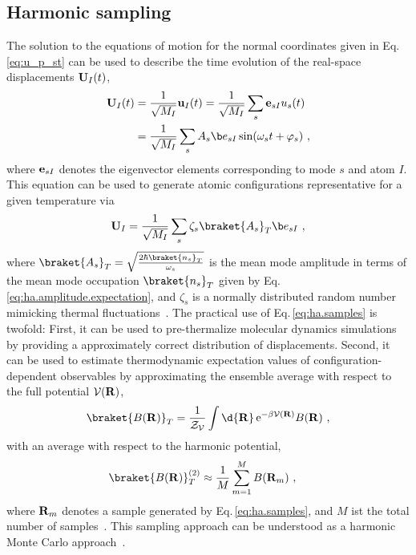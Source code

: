 \subsection{Harmonic sampling}
\label{sec:harmonic_sampling}
The solution to the equations of motion for the normal coordinates given in Eq.\,\eqref{eq:u_p_st} can be used to describe the time evolution of the real-space displacements ${\bf U}_I (t)$,
\begin{align}
	{\bf U}_I (t) 
		&= \frac{1}{\sqrt{M_I}} {\bf u}_I (t) 
		= \frac{1}{\sqrt{M_I}} \sum_s {\bf e}_{sI} u_s (t) \\
		&= \frac{1}{\sqrt{M_I}} \sum_s  A_s \b e_{sI} \sin (\omega_s t + \varphi_s)~,
\end{align}
where ${\bf e}_{sI}$ denotes the eigenvector elements corresponding to mode $s$ and atom $I$. This equation can be used to generate atomic configurations representative for a given temperature via
\begin{align}
	{\bf U}_I = \frac{1}{\sqrt{M_I}} \sum_s  \zeta_s \braket{A_s}_T \b e_{sI}~,
	\label{eq:ha.samples}
\end{align}
where $\braket{A_s}_T = \sqrt{\frac{2 \hbar \braket{n_s}_T}{\omega_s}}$ is the mean mode amplitude in terms of the mean mode occupation $\braket{n_s}_T$ given by Eq.\,\eqref{eq:ha.amplitude.expectation}, and $\zeta_s$ is a normally distributed random number mimicking thermal fluctuations~\cite{West2006}. The practical use of Eq.\,\eqref{eq:ha.samples} is twofold: First, it can be used to pre-thermalize molecular dynamics simulations by providing a approximately correct distribution of displacements. Second, it can be used to estimate thermodynamic expectation values of configuration-dependent observables by approximating the ensemble average with respect to the full potential $\mathcal V ({\bf R})$,
\begin{align}
	\braket{B ({\bf R})}_T
		= \frac{1}{\mathcal{Z}_{\mathcal{V}}} \int \d {\bf R} \,{\rm e}^{- \beta \mathcal V ({\bf R})} B({\bf R})~,
	\label{eq:ha.expectation.0}
\end{align}
with an average with respect to the harmonic potential,
\begin{align}
	\braket{B ({\bf R})}_T^{(2)}
		&\approx  \frac{1}{M} \sum\limits_{m=1}^{M} B({\bf R}_m)~,
\label{eq:ha.expectation.1}
\end{align}
where ${\bf R}_m$ denotes a sample generated by Eq.\,\eqref{eq:ha.samples}, and $M$ ist the total number of samples~\cite[p.\,15]{FrenkelSmit}. This sampling approach can be understood as a harmonic Monte Carlo approach~\cite{West2006,Peslherbe1999}.

